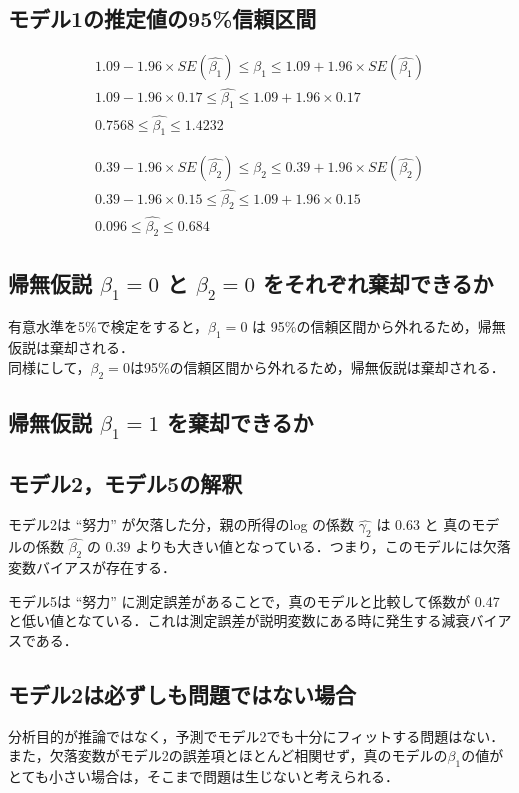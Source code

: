 \documentclass{article}
\begin{document}
\subsection{モデル1の推定値の95\%信頼区間}

\begin{centering}
  \begin{gather}
    1.09 - 1.96 \times SE(\hat{\beta_1}) \le \hat{\beta_1} \le 1.09 + 1.96 \times SE(\hat{\beta_1}) \\
    1.09 - 1.96 \times 0.17 \le \hat{\beta_1} \le 1.09 + 1.96 \times 0.17 \\
    0.7568 \le \hat{\beta_1} \le 1.4232
  \end{gather}
\end{centering}

\begin{centering}
  \begin{gather}
    0.39 - 1.96 \times SE(\hat{\beta_2}) \le \hat{\beta_2} \le 0.39 + 1.96 \times SE(\hat{\beta_2}) \\
    0.39 - 1.96 \times 0.15 \le \hat{\beta_2} \le 1.09 + 1.96 \times 0.15 \\
    0.096 \le \hat{\beta_2} \le 0.684
  \end{gather}
\end{centering}

\subsection{帰無仮説 $\beta_1 = 0$ と $\beta_2 = 0$ をそれぞれ棄却できるか }

有意水準を5\%で検定をすると，$\beta_1 = 0$ は 95\%の信頼区間から外れるため，帰無仮説は棄却される．\\
同様にして，$\beta_2 = 0$は95\%の信頼区間から外れるため，帰無仮説は棄却される．

\subsection{帰無仮説 $\beta_1 = 1$ を棄却できるか }

\subsection{モデル2，モデル5の解釈}

モデル2は “努力” が欠落した分，親の所得のlog の係数 $\hat{\gamma_2}$ は 0.63 と 真のモデルの係数 $\hat{\beta_2}$ の 0.39 よりも大きい値となっている．つまり，このモデルには欠落変数バイアスが存在する．

モデル5は “努力” に測定誤差があることで，真のモデルと比較して係数が 0.47 と低い値となている．これは測定誤差が説明変数にある時に発生する減衰バイアスである．

\subsection{モデル2は必ずしも問題ではない場合}

分析目的が推論ではなく，予測でモデル2でも十分にフィットする問題はない．\\
また，欠落変数がモデル2の誤差項とほとんど相関せず，真のモデルの$\beta_1$の値がとても小さい場合は，そこまで問題は生じないと考えられる．
\end{document}
